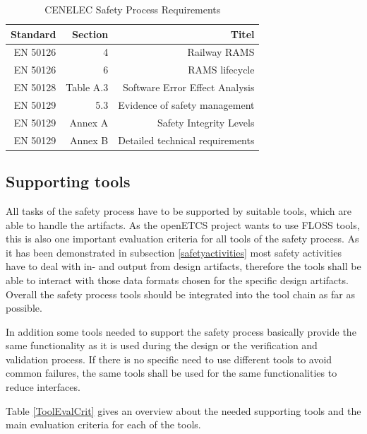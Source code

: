 \documentclass{template/openetcs_article}
\begin{document}
\begin{table}[htbp]
  \centering
  \caption{CENELEC Safety Process Requirements}
    \begin{tabular}{r|r|r}
    Standard & Section & Titel \\
    \hline
     EN 50126 & 4 & Railway RAMS  \\ 
    EN 50126 & 6 & RAMS lifecycle \\
     EN 50128 & Table A.3 & Software Error Effect Analysis\\
    EN 50129 & 5.3 & Evidence of safety management \\
    EN 50129 & Annex A & Safety Integrity Levels \\
    EN 50129 & Annex B & Detailed technical requirements \\
    \end{tabular}%
  \label{tab:Safety Process Requirements}%
\end{table}%

\subsection{Supporting tools}

All tasks of the safety process have to be supported by suitable tools, which are able to handle the artifacts. As the openETCS project wants to use FLOSS tools, this is also one important evaluation criteria for all tools of the safety process. As it has been demonstrated in subsection \ref{safetyactivities} most safety activities have to deal with in- and output from design artifacts, therefore the tools shall be able to interact with those data formats chosen for the specific design artifacts. Overall the safety process tools should be integrated into the tool chain as far as possible.  

In addition some tools needed to support the safety process basically provide the same functionality as it is used during the design or the verification and validation process. If there is no specific need to use different tools to avoid common failures, the same tools shall be used for the same functionalities to reduce interfaces.

Table \ref{ToolEvalCrit} gives an overview about the needed supporting tools and the main evaluation criteria for each of the tools.
\end{document}
